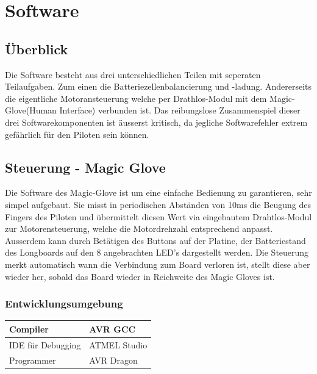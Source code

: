 \chapter{Software} \label{Software}
\section{Überblick}
Die Software besteht aus drei unterschiedlichen Teilen mit seperaten Teilaufgaben. Zum einen die Batteriezellenbalancierung und -ladung. Andererseits die eigentliche Motoransteuerung welche per Drathlos-Modul mit dem Magic-Glove(Human Interface) verbunden ist. Das reibungslose Zusammenspiel dieser drei Softwarekomponenten ist äusserst kritisch, da jegliche Softwarefehler extrem gefährlich für den Piloten sein können.
\section{Steuerung - Magic Glove} \label{SW_MagicGlove}
Die Software des Magic-Glove ist um eine einfache Bedienung zu garantieren, sehr simpel aufgebaut. Sie misst in periodischen Abständen von 10ms die Beugung des Fingers des Piloten und übermittelt diesen Wert via eingebautem Drahtlos-Modul zur Motorensteuerung, welche die Motordrehzahl entsprechend anpasst. Ausserdem kann durch Betätigen des Buttons auf der Platine, der Batteriestand des Longboards auf den 8 angebrachten LED's dargestellt werden. Die Steuerung merkt automatisch wann die Verbindung zum Board verloren ist, stellt diese aber wieder her, sobald das Board wieder in Reichweite des Magic Gloves ist.\\
\subsection*{Entwicklungsumgebung}
\begin{center}
	\begin{tabular}{ | l | l | }
		\hline
		Compiler & AVR GCC \\ \hline
		IDE für Debugging & ATMEL Studio \\ \hline
		Programmer & AVR Dragon \\ \hline
	\end{tabular}
\end{center}
